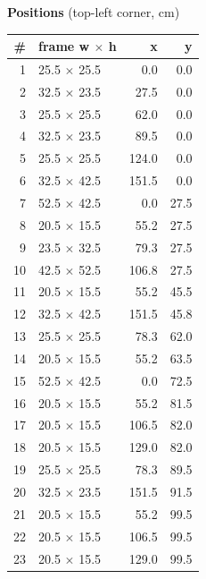 \documentclass[a4paper,landscape,10pt]{article}
\begin{document}
\begin{minipage}[t]{0.25\textwidth}
\vspace{8pt}
{\bfseries Positions} (top-left corner, cm)\\[2pt]
\tiny
\begin{tabular}{@{}r l r r@{}}
\toprule
\# & frame w $\times$ h & x & y \\
\midrule
1 & 25.5 $\times$ 25.5 & 0.0 & 0.0 \\
2 & 32.5 $\times$ 23.5 & 27.5 & 0.0 \\
3 & 25.5 $\times$ 25.5 & 62.0 & 0.0 \\
4 & 32.5 $\times$ 23.5 & 89.5 & 0.0 \\
5 & 25.5 $\times$ 25.5 & 124.0 & 0.0 \\
6 & 32.5 $\times$ 42.5 & 151.5 & 0.0 \\
7 & 52.5 $\times$ 42.5 & 0.0 & 27.5 \\
8 & 20.5 $\times$ 15.5 & 55.2 & 27.5 \\
9 & 23.5 $\times$ 32.5 & 79.3 & 27.5 \\
10 & 42.5 $\times$ 52.5 & 106.8 & 27.5 \\
11 & 20.5 $\times$ 15.5 & 55.2 & 45.5 \\
12 & 32.5 $\times$ 42.5 & 151.5 & 45.8 \\
13 & 25.5 $\times$ 25.5 & 78.3 & 62.0 \\
14 & 20.5 $\times$ 15.5 & 55.2 & 63.5 \\
15 & 52.5 $\times$ 42.5 & 0.0 & 72.5 \\
16 & 20.5 $\times$ 15.5 & 55.2 & 81.5 \\
17 & 20.5 $\times$ 15.5 & 106.5 & 82.0 \\
18 & 20.5 $\times$ 15.5 & 129.0 & 82.0 \\
19 & 25.5 $\times$ 25.5 & 78.3 & 89.5 \\
20 & 32.5 $\times$ 23.5 & 151.5 & 91.5 \\
21 & 20.5 $\times$ 15.5 & 55.2 & 99.5 \\
22 & 20.5 $\times$ 15.5 & 106.5 & 99.5 \\
23 & 20.5 $\times$ 15.5 & 129.0 & 99.5 \\
\bottomrule
\end{tabular}
\end{minipage}
\clearpage
\end{document}
